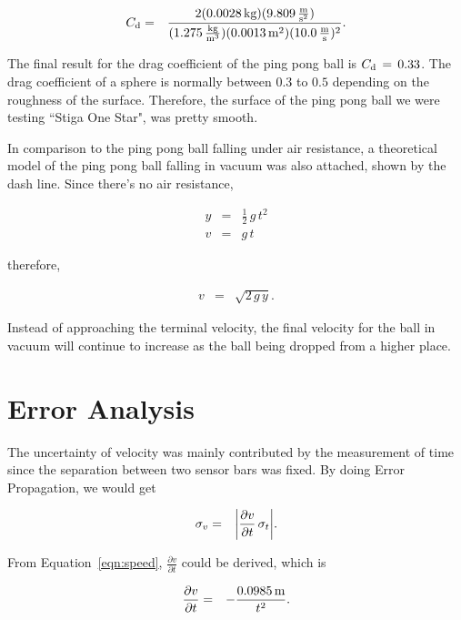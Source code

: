 \documentclass{article}
\begin{document}
\begin{eqnarray}
C_{\textnormal{d}}&=&\frac{2(0.0028\,\textnormal{kg})(9.809\,\frac{\textnormal{m}}{\textnormal{s}^{2}})}{(1.275\,\frac{\textnormal{kg}}{\textnormal{m}^{3}})(0.0013\,\textnormal{m}^{2})(10.0\,\frac{\textnormal{m}}{\textnormal{s}})^{2}}.
\label{eqn:finalcd}
\end{eqnarray}

\noindent The final result for the drag coefficient of the ping pong ball is $C_{\textnormal{d}}\,=\,0.33$. The drag coefficient of a sphere is normally between $0.3$ to $0.5$ depending on the roughness of the surface. Therefore, the surface of the ping pong ball we were testing ``Stiga One Star", was pretty smooth.  

\noindent In comparison to the ping pong ball falling under air resistance, a theoretical model of the ping pong ball falling in vacuum was also attached, shown by the dash line. Since there's no air resistance, 

\begin{eqnarray}
y&=&\frac{1}{2}\,g\,t^{2} \\ 
v&=&g\,t
\end{eqnarray}

\noindent therefore, 

\begin{eqnarray}
v&=&\sqrt{2\,g\,y}. 
\label{eqn:vac}
\end{eqnarray}

\noindent Instead of approaching the terminal velocity, the final velocity for the ball in vacuum will continue to increase as the ball being dropped from a higher place. 

\section{Error Analysis}

\noindent The uncertainty of velocity was mainly contributed by the measurement of time since the separation between two sensor bars was fixed. By doing Error Propagation, we would get

\begin{eqnarray}
\sigma_{v}&=&\abs{\frac{\partial v}{\partial t}\,\sigma_{t}}.
\label{eqn:error}
\end{eqnarray}

\noindent From Equation~\ref{eqn:speed}, $\frac{\partial v}{\partial t}$ could be derived, which is 

\begin{eqnarray}
\frac{\partial v}{\partial t}&=&-\frac{0.0985\,\textnormal{m}}{t^{2}}. 
\label{eqn:dvdt}
\end{eqnarray}
\end{document}
